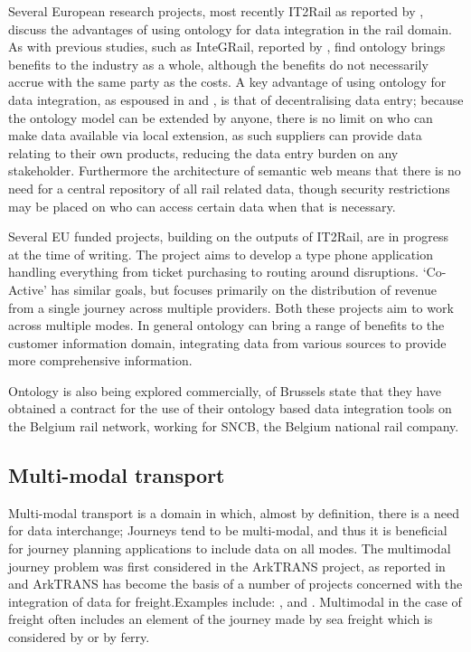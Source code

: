 Several European research projects, most recently IT2Rail as reported by \citet{Gogos2016}, discuss the advantages of using ontology for data integration in the rail domain. As with previous studies, such as InteGRail, reported  by \citet{Kopf2010}, \citet{Gogos2016} find ontology brings benefits to the industry as a whole, although the benefits do not necessarily accrue with the same party as the costs. A key advantage of using ontology for data integration, as espoused in \citep{Gogos2016} and \citep{Morris}, is that of decentralising data entry; because the ontology model can be extended by anyone, there is no limit on who can make data available via local extension, as such suppliers can provide data relating to their own products, reducing the data entry burden on any stakeholder. Furthermore the architecture of semantic web means that there is no need for a central repository of all rail related data, though security restrictions may be placed on who can access certain data when that is necessary.

Several EU funded projects, building on the outputs of IT2Rail, are in progress at the time of writing. The  project aims to develop a  type phone application handling everything from ticket purchasing to routing around disruptions. `Co-Active' has similar goals, but focuses primarily on the distribution of revenue from a single journey across multiple providers. Both these projects aim to work across multiple modes. In general ontology can bring a range of benefits to the customer information domain, integrating data from various sources to provide more comprehensive information. 

Ontology is also being explored commercially, \citet{ERTMSSolutions2017} of Brussels state that they have obtained a contract for the use of their ontology based data integration tools on the Belgium rail network, working for SNCB, the Belgium national rail company.

\subsection{Multi-modal transport}\label{subsec:multi}

Multi-modal transport is a domain in which, almost by definition, there is a need for data interchange; Journeys tend to be multi-modal, and thus it is beneficial for journey planning applications to include data on all modes. The multimodal journey problem was first considered in the ArkTRANS project, as reported in \citep{Natvig2003} and ArkTRANS has become the basis of a number of projects concerned with the integration of data for freight.Examples include: \citet{Gonczy2012} , \citep{Rodseth2011} and \citep{Paganelli2009}. Multimodal in the case of freight often includes an element of the journey made by sea freight which is considered by \citet{Rodseth2011} or by ferry.

